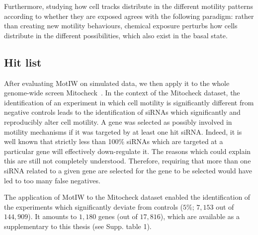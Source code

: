 Furthermore, studying how cell tracks distribute in the different motility patterns according to whether they are exposed agrees with the following paradigm: rather than creating new
motility behaviours, chemical exposure perturbs how cells distribute in the different possibilities, which also exist in the basal state.
\subsection{Hit list}
\label{sec:hitlist}
After evaluating MotIW on simulated data, we then apply it to the whole genome-wide screen Mitocheck~\cite{pmid20360735}. In the context of the Mitocheck dataset, the identification of an experiment in which cell motility is significantly different from negative controls leads to the identification of siRNAs which significantly and reproducibly alter cell motility. A gene was selected as possibly involved in motility mechanisms if it was targeted by at least one hit siRNA. Indeed, it is well known that strictly less than 100\% siRNAs which are targeted at a particular gene will effectively down-regulate it. The reasons which could explain this are still not completely understood. Therefore, requiring that more than one siRNA related to a given gene are selected for the gene to be selected would have led to too many false negatives.%

The application of MotIW to the Mitocheck dataset enabled the identification of the experiments which significantly deviate from controls ($5\%$; $7,153$ out of $144,909$). It amounts to $1,180$ genes (out of $17,816$), which are available as a supplementary to this thesis (see Supp. table 1).%

